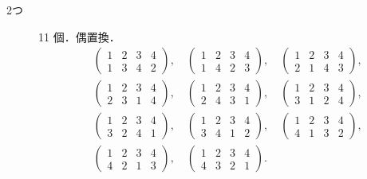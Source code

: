 \begin{tanswer}
\begin{description}
    \item[2つ] 11 個．偶置換．
          \begin{align*}
             & \begin{pmatrix} 1 & 2 & 3 & 4 \\ 1 & 3 & 4 & 2 \end{pmatrix},\quad
            \begin{pmatrix} 1 & 2 & 3 & 4 \\ 1 & 4 & 2 & 3 \end{pmatrix},\quad
            \begin{pmatrix} 1 & 2 & 3 & 4 \\ 2 & 1 & 4 & 3 \end{pmatrix},         \\
             & \begin{pmatrix} 1 & 2 & 3 & 4 \\ 2 & 3 & 1 & 4 \end{pmatrix},\quad
            \begin{pmatrix} 1 & 2 & 3 & 4 \\ 2 & 4 & 3 & 1 \end{pmatrix},\quad
            \begin{pmatrix} 1 & 2 & 3 & 4 \\ 3 & 1 & 2 & 4 \end{pmatrix},         \\
             & \begin{pmatrix} 1 & 2 & 3 & 4 \\ 3 & 2 & 4 & 1 \end{pmatrix},\quad
            \begin{pmatrix} 1 & 2 & 3 & 4 \\ 3 & 4 & 1 & 2 \end{pmatrix},\quad
            \begin{pmatrix} 1 & 2 & 3 & 4 \\ 4 & 1 & 3 & 2 \end{pmatrix},         \\
             & \begin{pmatrix} 1 & 2 & 3 & 4 \\ 4 & 2 & 1 & 3 \end{pmatrix},\quad
            \begin{pmatrix} 1 & 2 & 3 & 4 \\ 4 & 3 & 2 & 1 \end{pmatrix}.
          \end{align*}


\end{description}
\end{tanswer}
